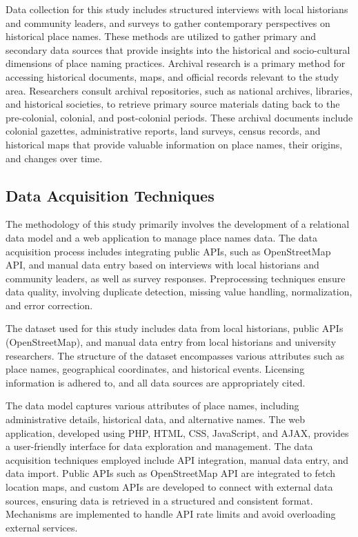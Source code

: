 Data collection for this study includes structured interviews with local historians and community leaders, and surveys to gather contemporary perspectives on historical place names. These methods are utilized to gather primary and secondary data sources that provide insights into the historical and socio-cultural dimensions of place naming practices. Archival research is a primary method for accessing historical documents, maps, and official records relevant to the study area. Researchers consult archival repositories, such as national archives, libraries, and historical societies, to retrieve primary source materials dating back to the pre-colonial, colonial, and post-colonial periods. These archival documents include colonial gazettes, administrative reports, land surveys, census records, and historical maps that provide valuable information on place names, their origins, and changes over time.

\subsection{Data Acquisition Techniques}

The methodology of this study primarily involves the development of a relational data model and a web application to manage place names data. The data acquisition process includes integrating public APIs, such as OpenStreetMap API, and manual data entry based on interviews with local historians and community leaders, as well as survey responses. Preprocessing techniques ensure data quality, involving duplicate detection, missing value handling, normalization, and error correction.

The dataset used for this study includes data from local historians, public APIs (OpenStreetMap), and manual data entry from local historians and university researchers. The structure of the dataset encompasses various attributes such as place names, geographical coordinates, and historical events. Licensing information is adhered to, and all data sources are appropriately cited.

The data model captures various attributes of place names, including administrative details, historical data, and alternative names. The web application, developed using PHP, HTML, CSS, JavaScript, and AJAX, provides a user-friendly interface for data exploration and management. The data acquisition techniques employed include API integration, manual data entry, and data import. Public APIs such as OpenStreetMap API are integrated to fetch location maps, and custom APIs are developed to connect with external data sources, ensuring data is retrieved in a structured and consistent format. Mechanisms are implemented to handle API rate limits and avoid overloading external services.


